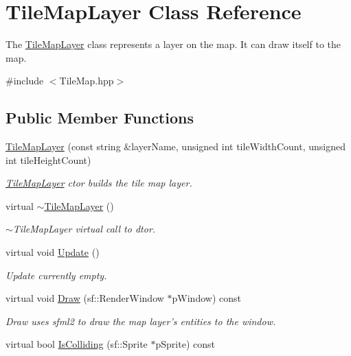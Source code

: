 \hypertarget{class_tile_map_layer}{\section{Tile\-Map\-Layer Class Reference}
\label{class_tile_map_layer}
}


The \hyperlink{class_tile_map_layer}{Tile\-Map\-Layer} class represents a layer on the map. It can draw itself to the map.  




{\ttfamily \#include $<$Tile\-Map.\-hpp$>$}

\subsection*{Public Member Functions}
\begin{DoxyCompactItemize}
\item 
\hyperlink{class_tile_map_layer_ac9fba07c129ad2a52be1601f58eee773}{Tile\-Map\-Layer} (const string \&layer\-Name, unsigned int tile\-Width\-Count, unsigned int tile\-Height\-Count)
\begin{DoxyCompactList}\small\item\em \hyperlink{class_tile_map_layer}{Tile\-Map\-Layer} ctor builds the tile map layer. \end{DoxyCompactList}\item 
virtual \hyperlink{class_tile_map_layer_a8bee35e5252ed1c3c1ea6935003c5d10}{$\sim$\-Tile\-Map\-Layer} ()
\begin{DoxyCompactList}\small\item\em $\sim$\-Tile\-Map\-Layer virtual call to dtor. \end{DoxyCompactList}\item 
virtual void \hyperlink{class_tile_map_layer_a1befe86a2d2bed2d410924875eca4847}{Update} ()
\begin{DoxyCompactList}\small\item\em Update currently empty. \end{DoxyCompactList}\item 
virtual void \hyperlink{class_tile_map_layer_ab09044152ad8bebc2afbe837858ac4ae}{Draw} (sf\-::\-Render\-Window $\ast$p\-Window) const 
\begin{DoxyCompactList}\small\item\em Draw uses sfml2 to draw the map layer's entities to the window. \end{DoxyCompactList}\item 
virtual bool \hyperlink{class_tile_map_layer_af6140d8910838621911ee1aaefcf317e}{Is\-Colliding} (sf\-::\-Sprite $\ast$p\-Sprite) const 

\end{DoxyCompactItemize}
